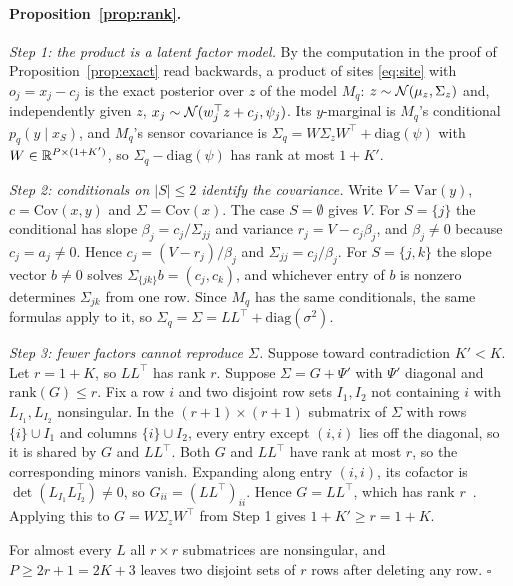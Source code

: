 \paragraph{Proposition~\ref{prop:rank}.}
\emph{Step 1: the product is a latent factor model.} By the computation in the proof of Proposition~\ref{prop:exact}
read backwards, a product of sites \eqref{eq:site} with $o_j=x_j-c_j$ is the exact posterior over $z$ of the model
$M_q$: $z\sim\mathcal{N}(\mu_z,\Sigma_z)$ and, independently given $z$, $x_j\sim\mathcal{N}(w_j^\top z+c_j,\psi_j)$. Its $y$-marginal is
$M_q$'s conditional $p_q(y\mid x_S)$, and $M_q$'s sensor covariance is $\Sigma_q=W\Sigma_zW^\top+\mathrm{diag}(\psi)$
with $W\in\mathbb{R}^{P\times(1+K')}$, so $\Sigma_q-\mathrm{diag}(\psi)$ has rank at most $1+K'$.

\emph{Step 2: conditionals on $|S|\leq2$ identify the covariance.} Write $V=\mathrm{Var}(y)$, $c=\mathrm{Cov}(x,y)$
and $\Sigma=\mathrm{Cov}(x)$. The case $S=\emptyset$ gives $V$. For $S=\{j\}$ the conditional has slope
$\beta_j=c_j/\Sigma_{jj}$ and variance $r_j=V-c_j\beta_j$, and $\beta_j\neq0$ because $c_j=a_j\neq0$. Hence
$c_j=(V-r_j)/\beta_j$ and $\Sigma_{jj}=c_j/\beta_j$. For $S=\{j,k\}$ the slope vector $b\neq0$ solves
$\Sigma_{\{jk\}}b=(c_j,c_k)$, and whichever entry of $b$ is nonzero determines $\Sigma_{jk}$ from one row. Since
$M_q$ has the same conditionals, the same formulas apply to it, so $\Sigma_q=\Sigma=LL^\top+\mathrm{diag}(\sigma^2)$.

\emph{Step 3: fewer factors cannot reproduce $\Sigma$.} Suppose toward contradiction $K'<K$. Let $r=1+K$, so $LL^\top$ has rank $r$. Suppose
$\Sigma=G+\Psi'$ with $\Psi'$ diagonal and $\mathrm{rank}(G)\leq r$. Fix a row $i$ and two disjoint row sets $I_1,I_2$
not containing $i$ with $L_{I_1},L_{I_2}$ nonsingular. In the $(r+1)\times(r+1)$ submatrix of $\Sigma$ with rows
$\{i\}\cup I_1$ and columns $\{i\}\cup I_2$, every entry except $(i,i)$ lies off the diagonal, so it is shared by $G$
and $LL^\top$. Both $G$ and $LL^\top$ have rank at most $r$, so the corresponding minors vanish. Expanding along entry
$(i,i)$, its cofactor is $\det(L_{I_1}L_{I_2}^\top)\neq0$, so $G_{ii}=(LL^\top)_{ii}$. Hence $G=LL^\top$, which has
rank $r$~\citep{anderson1956statistical}. Applying this to $G=W\Sigma_zW^\top$ from Step 1 gives $1+K'\geq r=1+K$.

For almost every $L$ all $r\times r$ submatrices are nonsingular, and $P\geq2r+1=2K+3$ leaves two disjoint sets of $r$
rows after deleting any row. \hfill$\square$

